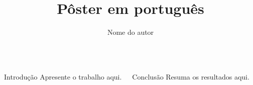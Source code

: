 \documentclass{beamer}
\title{Pôster em português}
\author{Nome do autor}
\begin{document}
\begin{frame}
\begin{columns}[t]
  \begin{block}{Introdução}
    Apresente o trabalho aqui.
  \end{block}
  \begin{block}{Conclusão}
    Resuma os resultados aqui.
  \end{block}
\end{columns}
\end{frame}
\end{document}
